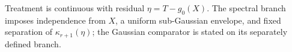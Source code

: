 Treatment is continuous with residual \(\eta=T-g_0(X)\).  The spectral branch imposes independence from \(X\), a uniform sub-Gaussian envelope, and fixed separation of \(\kappa_{r+1}(\eta)\); the Gaussian comparator is stated on its separately defined branch.